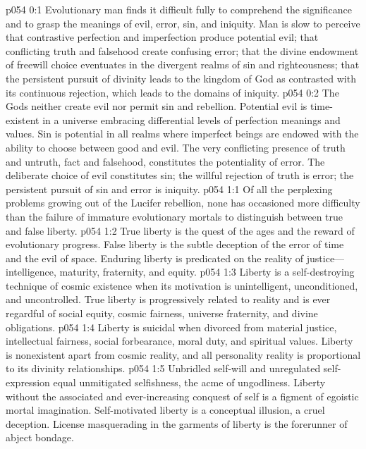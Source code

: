 \author{Mighty Messenger}
\vs p054 0:1 Evolutionary man finds it difficult fully to comprehend the significance and to grasp the meanings of evil, error, sin, and iniquity. Man is slow to perceive that contrastive perfection and imperfection produce potential evil; that conflicting truth and falsehood create confusing error; that the divine endowment of freewill choice eventuates in the divergent realms of sin and righteousness; that the persistent pursuit of divinity leads to the kingdom of God as contrasted with its continuous rejection, which leads to the domains of iniquity.\plusone
\vs p054 0:2 The Gods neither create evil nor permit sin and rebellion. Potential evil is time\hyp{}existent in a universe embracing differential levels of perfection meanings and values. Sin is potential in all realms where imperfect beings are endowed with the ability to choose between good and evil. The very conflicting presence of truth and untruth, fact and falsehood, constitutes the potentiality of error. The deliberate choice of evil constitutes sin; the willful rejection of truth is error; the persistent pursuit of sin and error is iniquity.
\vs p054 1:1 Of all the perplexing problems growing out of the Lucifer rebellion, none has occasioned more difficulty than the failure of immature evolutionary mortals to distinguish between true and false liberty.
\vs p054 1:2 True liberty is the quest of the ages and the reward of evolutionary progress. False liberty is the subtle deception of the error of time and the evil of space. Enduring liberty is predicated on the reality of justice---intelligence, maturity, fraternity, and equity.
\vs p054 1:3 Liberty is a self\hyp{}destroying technique of cosmic existence when its motivation is unintelligent, unconditioned, and uncontrolled. True liberty is progressively related to reality and is ever regardful of social equity, cosmic fairness, universe fraternity, and divine obligations.
\vs p054 1:4 Liberty is suicidal when divorced from material justice, intellectual fairness, social forbearance, moral duty, and spiritual values. Liberty is nonexistent apart from cosmic reality, and all personality reality is proportional to its divinity relationships.
\vs p054 1:5 Unbridled self\hyp{}will and unregulated self\hyp{}expression equal unmitigated selfishness, the acme of ungodliness. Liberty without the associated and ever\hyp{}increasing conquest of self is a figment of egoistic mortal imagination. Self\hyp{}motivated liberty is a conceptual illusion, a cruel deception. License masquerading in the garments of liberty is the forerunner of abject bondage.
